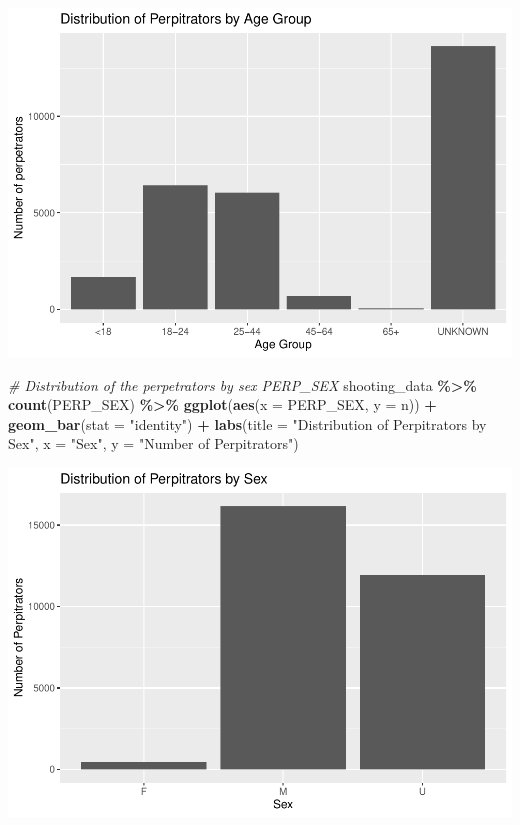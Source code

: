 \documentclass[
]{article}
\newenvironment{Shaded}{\begin{snugshade}}{\end{snugshade}}
\newcommand{\AttributeTok}[1]{\textcolor[rgb]{0.13,0.29,0.53}{#1}}
\newcommand{\CommentTok}[1]{\textcolor[rgb]{0.56,0.35,0.01}{\textit{#1}}}
\newcommand{\FunctionTok}[1]{\textcolor[rgb]{0.13,0.29,0.53}{\textbf{#1}}}
\newcommand{\NormalTok}[1]{#1}
\newcommand{\SpecialCharTok}[1]{\textcolor[rgb]{0.81,0.36,0.00}{\textbf{#1}}}
\newcommand{\StringTok}[1]{\textcolor[rgb]{0.31,0.60,0.02}{#1}}
\begin{document}
\includegraphics{nypd-shooting-data-analysis_files/figure-latex/distributions-1.pdf}

\begin{Shaded}
\begin{Highlighting}[]
\CommentTok{\# Distribution of the perpetrators by sex PERP\_SEX}
\NormalTok{shooting\_data }\SpecialCharTok{\%\textgreater{}\%}
  \FunctionTok{count}\NormalTok{(PERP\_SEX) }\SpecialCharTok{\%\textgreater{}\%}
  \FunctionTok{ggplot}\NormalTok{(}\FunctionTok{aes}\NormalTok{(}\AttributeTok{x =}\NormalTok{ PERP\_SEX, }\AttributeTok{y =}\NormalTok{ n)) }\SpecialCharTok{+}
  \FunctionTok{geom\_bar}\NormalTok{(}\AttributeTok{stat =} \StringTok{"identity"}\NormalTok{) }\SpecialCharTok{+}
  \FunctionTok{labs}\NormalTok{(}\AttributeTok{title =} \StringTok{"Distribution of Perpitrators by Sex"}\NormalTok{,}
       \AttributeTok{x =} \StringTok{"Sex"}\NormalTok{,}
       \AttributeTok{y =} \StringTok{"Number of Perpitrators"}\NormalTok{)}
\end{Highlighting}
\end{Shaded}

\includegraphics{nypd-shooting-data-analysis_files/figure-latex/distributions-2.pdf}
\end{document}
